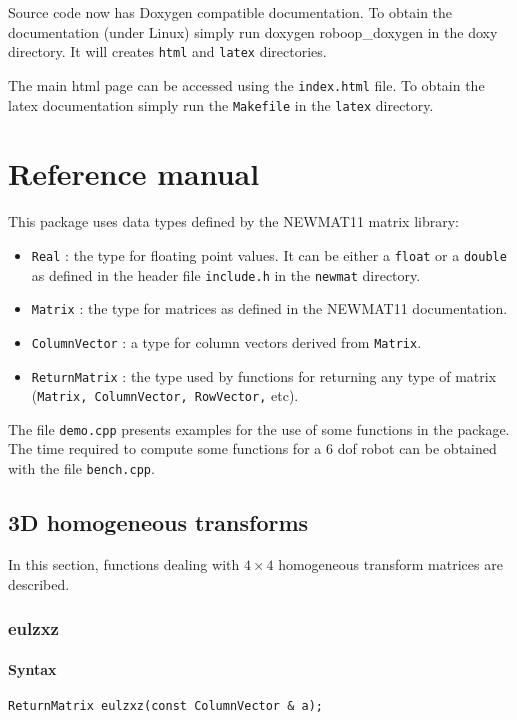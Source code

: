 \documentclass[dvips,11pt,fleqn]{report}
\begin{document}
Source code now has \textsf{Doxygen} compatible documentation. To
obtain the documentation (under \textsf{Linux}) simply run
\textsf{doxygen roboop\_doxygen} in the doxy directory. It will
creates \texttt{html} and \texttt{latex} directories.

The main html page can be accessed using the \texttt{index.html} file.
To obtain the latex documentation simply run the \texttt{Makefile} in
the \texttt{latex} directory.

\chapter{Reference manual}

This package uses data types defined by the \textsf{NEWMAT11} matrix
library:
\begin{itemize}
\item {\tt Real} : the type for floating point values. It can be 
either a {\tt float} or a {\tt double}  as defined in the header file 
{\tt include.h} in the {\tt newmat} directory.

\item {\tt Matrix} : the type for matrices as defined in the
    \textsf{NEWMAT11} documentation.

\item {\tt ColumnVector} : a type for column vectors derived from {\tt Matrix}.

\item {\tt ReturnMatrix} : the type used by functions for returning any type of 
matrix ({\tt Matrix, ColumnVector, RowVector,} etc). 
\end{itemize}

The file {\tt demo.cpp} presents examples for the use of some functions in the 
package. The time required to compute some functions for a 6 dof robot can be obtained
with the file {\tt bench.cpp}.
\section{3D homogeneous transforms}

In this section, functions dealing with $4 \times 4$ homogeneous transform
matrices are described.

\newpage

\subsection*{eulzxz}

\subsubsection*{Syntax}
\begin{verbatim}
ReturnMatrix eulzxz(const ColumnVector & a);
\end{verbatim}
\end{document}
